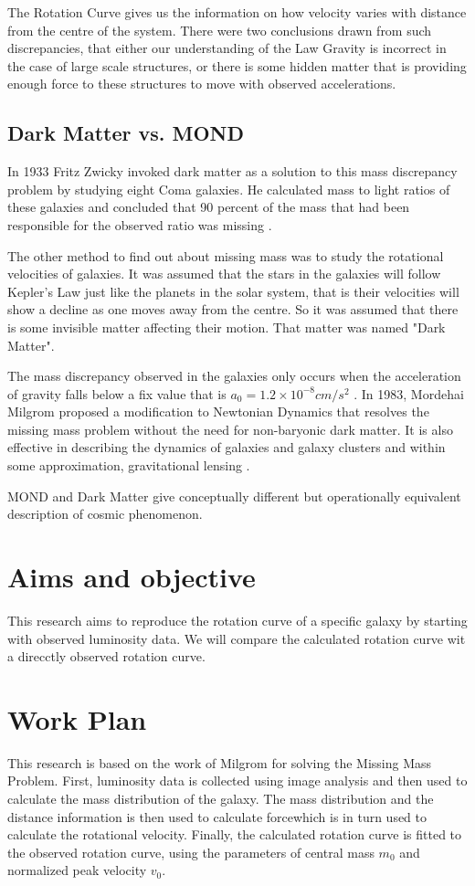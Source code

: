  The Rotation Curve gives us the information on how   velocity varies with distance from the centre of the system. There were two conclusions drawn from such discrepancies, that either our understanding of the Law Gravity is incorrect in the case of large scale structures, or there is some hidden matter that is providing enough force to these structures to move with observed accelerations.

\subsection{Dark Matter vs. MOND}
   In 1933 Fritz Zwicky invoked dark matter as a solution to this mass discrepancy problem by studying eight Coma galaxies. He calculated mass to light ratios of these galaxies and concluded that 90 percent of the mass that had been responsible for the observed ratio was missing \cite{dm_3}. 
   
   The other method to find out about missing mass was to study the rotational velocities of galaxies. It was assumed that the stars in the galaxies will follow  Kepler's Law just like the planets in the solar system, that is their velocities will show a decline as one moves away from the centre. So it was assumed that there is some invisible matter affecting their motion. That matter was named "Dark Matter".
   
\cite{mond} \cite{dm_1} \cite{dm_2} The mass discrepancy observed in the galaxies only occurs when the acceleration of gravity falls below a fix value that is $a_{0}= 1.2 \times 10^{-8} cm/s^2$ \cite{mond_1}. In 1983, Mordehai Milgrom proposed a modification to Newtonian Dynamics that resolves the missing mass problem without  the need for non-baryonic dark matter. It is also effective in describing the dynamics of galaxies and galaxy clusters and within some approximation, gravitational lensing \cite{mond_2} \cite{mond_3}. 

MOND and Dark Matter give conceptually different but operationally equivalent description of cosmic phenomenon.

\section{Aims and objective}
This research aims to reproduce the rotation curve of a specific galaxy by starting with observed luminosity data. We will compare the calculated rotation curve wit a direcctly observed rotation curve.

\section{Work Plan}
 This research is based on the work of Milgrom for solving the Missing Mass Problem. First, luminosity  data is collected using image analysis and then used to calculate the mass distribution of the galaxy. The mass distribution and the distance information is then used to calculate forcewhich is in turn used to calculate  the rotational velocity. Finally, the calculated  rotation curve is fitted to the observed rotation curve, using the parameters of central mass $ m_{0}$ and normalized peak velocity $ v_{0} $. 
